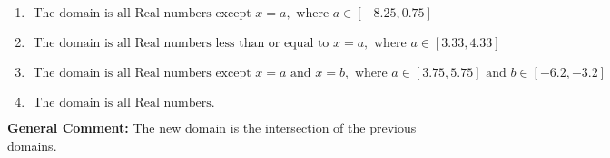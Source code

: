 \documentclass{extbook}[14pt]
\begin{document}
\begin{enumerate}
{\begin{enumerate}[label=\Alph*.]
\item \( \text{ The domain is all Real numbers except } x = a, \text{ where } a \in [-8.25, 0.75] \)


\item \( \text{ The domain is all Real numbers less than or equal to } x = a, \text{ where } a \in [3.33, 4.33] \)


\item \( \text{ The domain is all Real numbers except } x = a \text{ and } x = b, \text{ where } a \in [3.75, 5.75] \text{ and } b \in [-6.2, -3.2] \)


\item \( \text{ The domain is all Real numbers. } \)


\end{enumerate}

\textbf{General Comment:} The new domain is the intersection of the previous domains.
}
\end{enumerate}
\end{document}
